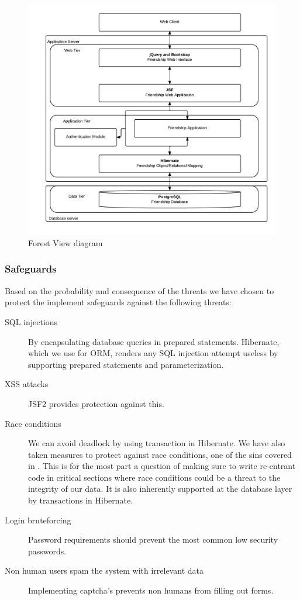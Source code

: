 \documentclass[a4paper]{article}
\begin{document}
\begin{figure}[h!]
\centering
\includegraphics[scale=0.35]{ForestView}
\caption{Forest View diagram}
\label{fig:forest_view}
\end{figure}

\subsubsection{Safeguards}
Based on the probability and consequence of the threats we have chosen to protect the implement safeguards against the following threats:
\begin{description}
\item[SQL injections] By encapsulating database queries in prepared statements. Hibernate, which we use for ORM, renders any SQL injection attempt useless by supporting prepared statements and parameterization.
\item[XSS attacks] JSF2 provides protection against this.
\item[Race conditions] We can avoid deadlock by using transaction in Hibernate. 
We have also taken measures to protect against race conditions, one of the sins covered in \cite{sins2009}. This is for the most part a question of making sure to write re-entrant code in critical sections where race conditions could be a threat to the integrity of our data. It is also inherently supported at the database layer by transactions in Hibernate.
\item[Login bruteforcing] Password requirements should prevent the most common low security passwords.
\item[Non human users spam the system with irrelevant data] Implementing captcha's prevents non humans from filling out forms.
\end{description}
\end{document}
